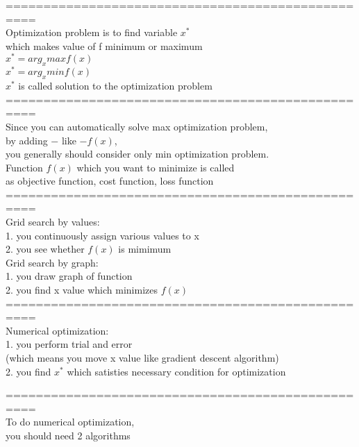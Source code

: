 \documentclass{article}
\begin{document}
==================================================\\
Optimization problem is to find variable $x^*$ \\ 
which makes value of f minimum or maximum \\ 

$x^*=arg_x max f(x)$ \\ 
$x^*=arg_x min f(x)$ \\ 

$x^*$ is called solution to the optimization problem \\ 

==================================================\\
Since you can automatically solve max optimization problem,\\
by adding $-$ like $-f(x)$,\\
you generally should consider only min optimization problem.\\ 

Function $f(x)$ which you want to minimize is called \\ 
as objective function, cost function, loss function \\

==================================================\\

Grid search by values: \\ 
1. you continuously assign various values to x \\ 
2. you see whether $f(x)$ is mimimum \\

Grid search by graph: \\ 
1. you draw graph of function \\ 
2. you find x value which minimizes $f(x)$ \\

==================================================\\
Numerical optimization: \\ 
1. you perform trial and error \\ 
(which means you move x value like gradient descent algorithm) \\ 
2. you find $x^*$ which satisties necessary condition for optimization

==================================================\\
To do numerical optimization, \\ 
you should need 2 algorithms \\ 
\end{document}
